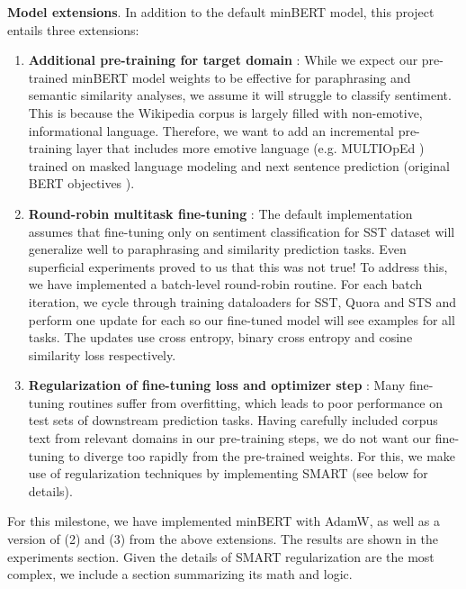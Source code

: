 \documentclass{article}
\begin{document}
\textbf{Model extensions}. In addition to the default minBERT model, this project entails three extensions:
\begin{enumerate}
    \item \textbf{Additional pre-training for target domain} \cite{pretrain}: While we expect our pre-trained minBERT model weights to be effective for paraphrasing and semantic similarity analyses, we assume it will struggle to classify sentiment. This is because the Wikipedia corpus is largely filled with non-emotive, informational language. Therefore, we want to add an incremental pre-training layer that includes more emotive language (e.g. MULTIOpEd \cite{multioped}) trained on masked language modeling and next sentence prediction (original BERT objectives \cite{bert}). 

    \item \textbf{Round-robin multitask fine-tuning} \cite{handout}: The default implementation assumes that fine-tuning only on sentiment classification for SST dataset will generalize well to paraphrasing and similarity prediction tasks. Even superficial experiments proved to us that this was not true! To address this, we have implemented a batch-level round-robin routine. For each batch iteration, we cycle through training dataloaders for SST, Quora and STS and perform one update for each so our fine-tuned model will see examples for all tasks. The updates use cross entropy, binary cross entropy and cosine similarity loss respectively.

    \item \textbf{Regularization of fine-tuning loss and optimizer step} \cite{smart}: Many fine-tuning routines suffer from overfitting, which leads to poor performance on test sets of downstream prediction tasks. Having carefully included corpus text from relevant domains in our pre-training steps, we do not want our fine-tuning to diverge too rapidly from the pre-trained weights. For this, we make use of regularization techniques by implementing SMART (see below for details).
\end{enumerate}

For this milestone, we have implemented minBERT with AdamW, as well as a version of (2) and (3) from the above extensions. The results are shown in the experiments section. Given the details of SMART regularization are the most complex, we include a section summarizing its math and logic.

\end{document}
